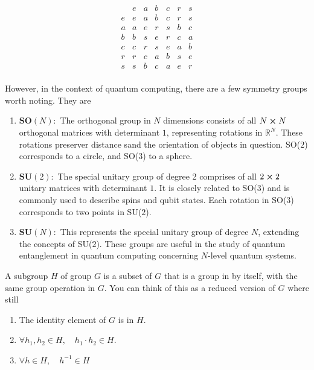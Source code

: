 \documentclass[12pt]{article}
\begin{document}
\[
\begin{array}{c|cccccc}
   & e & a & b & c & r & s \\
\hline
e & e & a & b & c & r & s \\
a & a & e & r & s & b & c \\
b & b & s & e & r & c & a \\
c & c & r & s & e & a & b \\
r & r & c & a & b & s & e \\
s & s & b & c & a & e & r \\
\end{array}
\]



However, in the context of quantum computing, there are a few symmetry groups worth noting. They are

\begin{enumerate}
    \item $\mathbf{SO}(N):$ The orthogonal group in $N$ dimensions consists of all $N \cross N$ orthogonal matrices with determinant $1$, representing rotations in $\mathbb{R}^N$. These rotations preserver distance sand the orientation of objects in question. SO($2$) corresponds to a circle, and SO($3$) to a sphere. 
    \item $\mathbf{SU}(2):$ The special unitary group of degree 2 comprises of all $2 \cross 2$ unitary matrices with determinant $1$. It is closely related to SO($3$) and is commonly used to describe spins and qubit states. Each rotation in SO($3$) corresponds to two points in SU($2$). 
    \item $\mathbf{SU}(N):$ This represents the special unitary group of degree $N$, extending the concepts of SU($2$). These groups are useful in the study of quantum entanglement in quantum computing concerning $N$-level quantum systems. 
\end{enumerate}

\begin{definition}[Subgroups]
    A subgroup $H$ of group $G$ is a subset of $G$ that is a group in by itself, with the same group operation in $G$. You can think of this as a reduced version of $G$ where still 
    \begin{enumerate}
        \item The identity element of $G$ is in $H$.
        \item $\forall h_1, h_2 \in H, \quad h_1 \cdot h_2 \in H$.
        \item $\forall h \in H, \quad h^{-1} \in H$
    \end{enumerate}
\end{definition}
\end{document}
